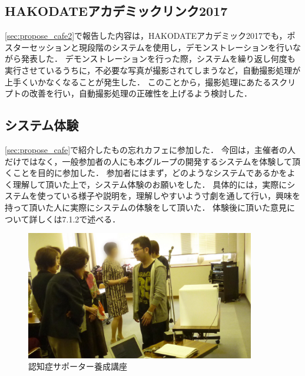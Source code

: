\documentclass[../report]{subfiles}
\begin{document}
\subsection{HAKODATEアカデミックリンク2017}
\ref{sec:propose_cafe2}で報告した内容は，HAKODATEアカデミック2017でも，ポスターセッションと現段階のシステムを使用し，デモンストレーションを行いながら発表した．
デモンストレーションを行った際，システムを繰り返し何度も実行させているうちに，不必要な写真が撮影されてしまうなど，自動撮影処理が上手くいかなくなることが発生した．
このことから，撮影処理にあたるスクリプトの改善を行い，自動撮影処理の正確性を上げるよう検討した．

\subsection{システム体験}
\ref{sec:propose_cafe}で紹介したもの忘れカフェに参加した．
今回は，主催者の人だけではなく，一般参加者の人にも本グループの開発するシステムを体験して頂くことを目的に参加した．
参加者にはまず，どのようなシステムであるかをよく理解して頂いた上で，システム体験のお願いをした．
具体的には，実際にシステムを使っている様子や説明を，理解しやすいよう寸劇を通して行い，興味を持って頂いた人に実際にシステムの体験をして頂いた．
体験後に頂いた意見について詳しくは7.1.2で述べる．
\begin{figure}[htbp]
    \begin{center}
        \includegraphics[width=10cm]{imgs/2_system_taiken.jpg}
        \caption{認知症サポーター養成講座}
    \end{center}
\end{figure}
\end{document}
